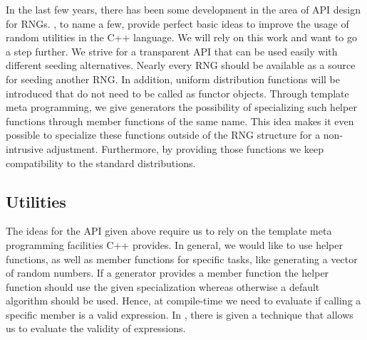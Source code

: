 \documentclass{stdlocal}
\begin{document}
  In the last few years, there has been some development in the area of API design for RNGs.
  \textcite{oneill-blog-api,oneill-blog-rd,cpp-std-seeding,cpp-std-random}, to name a few, provide perfect basic ideas to improve the usage of random utilities in the C++ language.
  We will rely on this work and want to go a step further.
  We strive for a transparent API that can be used easily with different seeding alternatives.
  Nearly every RNG should be available as a source for seeding another RNG.
  In addition, uniform distribution functions will be introduced that do not need to be called as functor objects.
  Through template meta programming, we give generators the possibility of specializing such helper functions through member functions of the same name.
  This idea makes it even possible to specialize these functions outside of the RNG structure for a non-intrusive adjustment.
  Furthermore, by providing those functions we keep compatibility to the standard distributions.

  \subsection{Utilities} %
  \label{sub:utilities}
    The ideas for the API given above require us to rely on the template meta programming facilities C++ provides.
    In general, we would like to use helper functions, as well as member functions for specific tasks, like generating a vector of random numbers.
    If a generator provides a member function the helper function should use the given specialization whereas otherwise a default algorithm should be used.
    Hence, at compile-time we need to evaluate if calling a specific member is a valid expression.
    In \textcite{vandevoorde2018}, there is given a technique that allows us to evaluate the validity of expressions.
\end{document}
